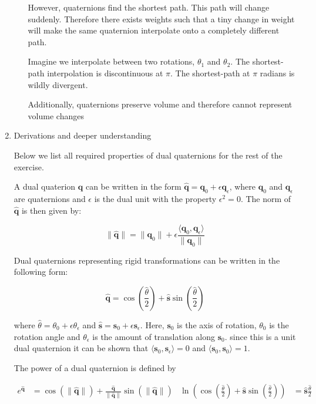 \documentclass[10pt,\jkfside,a4paper]{article}
\begin{document}
\begin{enumerate}
\begin{enumerate}
However, quaternions find the shortest path. This path will change suddenly.
Therefore there exists weights such that a tiny change in weight will make
the same quaternion interpolate onto a completely different path.

{\color{blue} Imagine we interpolate between two rotations, $\theta_1$ and
$\theta_2$. The shortest-path interpolation is discontinuous at $\pi$. The
shortest-path at $\pi$ radians is wildly divergent.}

{\color{blue} Additionally, quaternions preserve volume and therefore cannot
represent volume changes}

\end{enumerate}

\item Derivations and deeper understanding

Below we list all required properties of dual quaternions for the rest of
the exercise.

A dual quaterion $\hat{\mathbf{q}}$ can be written in the form
$\hat{\mathbf{q}} = \mathbf{q}_0 + \epsilon\mathbf{q}_\epsilon $, where
$\mathbf{q}_0$ and $\mathbf{q}_\epsilon$ are quaternions and $\epsilon$ is
the dual unit with the property $\epsilon^2 = 0$. The norm of
$\hat{\mathbf{q}}$ is then given by:

\[
\|\hat{\mathbf{q}}\| = \|\mathbf{q}_0\| + \epsilon\frac{\langle
\mathbf{q}_0, \mathbf{q}_\epsilon \rangle}{\|\mathbf{q}_0\|}
\]

Dual quaternions representing rigid transformations can be written in the
following form:

\[
\hat{\mathbf{q}} = \cos\left( \frac{\hat{\theta}}{2} \right) +
\hat{\mathbf{s}}\sin\left( \frac{\hat{\theta}}{2} \right)
\]

where $\hat{\theta} = \theta_0 + \epsilon\theta_\epsilon$ and
$\hat{\mathbf{s}} = \mathbf{s}_0 + \epsilon\mathbf{s}_\epsilon$. Here,
$\mathbf{s}_0$ is the axis of rotation, $\theta_0$ is the rotation angle and
$\theta_\epsilon$ is the amount of translation along $\mathbf{s}_0$. since
this is a unit dual quaternion it can be shown that $ \langle \mathbf{s}_0,
\mathbf{s}_\epsilon \rangle = 0 $ and $ \langle \mathbf{s}_0, \mathbf{s}_0
\rangle = 1$.

The power of a dual quaternion is defined by

\begin{align*}
e^{\hat{\mathbf{q}}} &= \cos\left( \|\hat{\mathbf{q}}\| \right) +
\frac{\hat{\mathbf{q}}}{\|\hat{\mathbf{q}}\|}\sin\left( \|\hat{\mathbf{q}}\| \right)
&
\ln\left( \cos\left( \frac{\hat{\theta}}{2} \right) +
\hat{\mathbf{s}}\sin\left( \frac{\hat{\theta}}{2} \right) \right) &=
\hat{\mathbf{s}}\frac{\hat{\theta}}{2}
\end{align*}


\end{enumerate}
\end{document}
